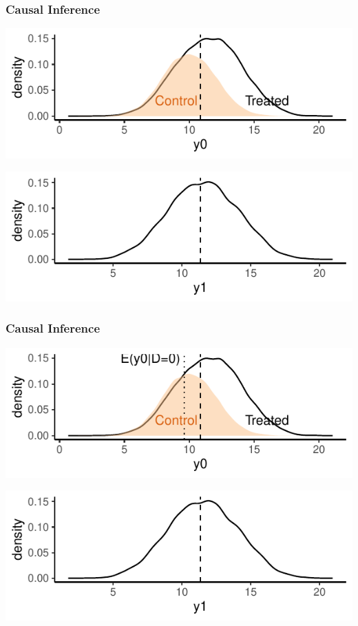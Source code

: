 \documentclass[xcolor=x11names,compress]{beamer}\usepackage[]{graphicx}\usepackage[]{xcolor}
\makeatletter
\def\maxwidth{ %
  \ifdim\Gin@nat@width>\linewidth
    \linewidth
  \else
    \Gin@nat@width
  \fi
}
\newenvironment{knitrout}{}{} %
\renewcommand{\(}{\begin{columns}}
\renewcommand{\)}{\end{columns}}
\newcommand{\<}[1]{\begin{column}{#1}}
\renewcommand{\>}{\end{column}}
\makeatother
\begin{document}
\begin{frame}
\frametitle{Causal Inference}
\begin{knitrout}
\color{fgcolor}
\includegraphics[width=\maxwidth]{figure/OVB1b-1} 
\end{knitrout}

\begin{knitrout}
\color{fgcolor}
\includegraphics[width=\maxwidth]{figure/OVB2b-1} 
\end{knitrout}
\end{frame}

\begin{frame}
\frametitle{Causal Inference}
\begin{knitrout}
\color{fgcolor}
\includegraphics[width=\maxwidth]{figure/OVB1c-1} 
\end{knitrout}

\begin{knitrout}
\color{fgcolor}
\includegraphics[width=\maxwidth]{figure/OVB2c-1} 
\end{knitrout}
\end{frame}
\end{document}
